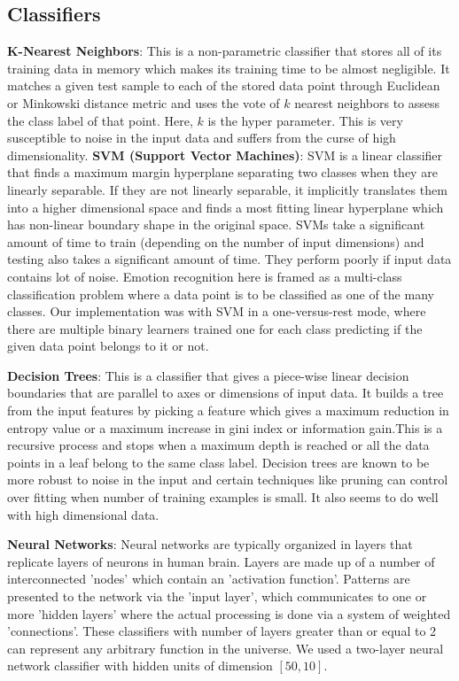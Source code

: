 \documentclass[10pt,twocolumn,letterpaper]{article}
\begin{document}
\subsection{Classifiers}
\textbf{K-Nearest Neighbors}: This is a non-parametric classifier that stores all of its training data in memory which makes its training time to be almost negligible. It matches a given test sample to each of the stored data point through Euclidean or Minkowski distance metric and uses the vote of $k$ nearest neighbors to assess the class label of that point. Here, $k$ is the hyper parameter. This is very susceptible to noise in the input data and suffers from the curse of high dimensionality. \newline
\textbf{SVM (Support Vector Machines)}: SVM is a linear classifier that finds a maximum margin hyperplane separating two classes when they are linearly separable. If they are not linearly separable, it implicitly translates them into a higher dimensional space and finds a most fitting linear hyperplane which has non-linear boundary shape in the original space. SVMs take a significant amount of time to train (depending on the number of input dimensions) and testing also takes a significant amount of time. They perform poorly if input data contains lot of noise. Emotion recognition here is framed as a multi-class classification problem where a data point is to be classified as one of the many classes. Our implementation was with SVM in a one-versus-rest mode, where there are multiple binary learners trained one for each class predicting if the given data point belongs to it or not.\newline


\textbf{Decision Trees}: This is a classifier that gives a piece-wise linear decision boundaries that are parallel to axes or dimensions of input data. It builds a tree from the input features by picking a feature which gives a maximum reduction in  entropy value or a maximum increase in gini index or information gain.This is a recursive process and stops when a maximum depth is reached or all the data points in a leaf belong to the same class label. Decision trees are known to be more robust to noise in the input and certain techniques like pruning can control over fitting when number of training examples is small. It also seems to do well with high dimensional data. \newline

\textbf{Neural Networks}: Neural networks are typically organized in layers that replicate layers of neurons in human brain. Layers are made up of a number of interconnected 'nodes' which contain an 'activation function'. Patterns are presented to the network via the 'input layer', which communicates to one or more 'hidden layers' where the actual processing is done via a system of weighted 'connections'. These classifiers with number of layers greater than or equal to 2 can represent any arbitrary function in the universe. We used a two-layer neural network classifier with hidden units of dimension $[50, 10]$.
\end{document}
